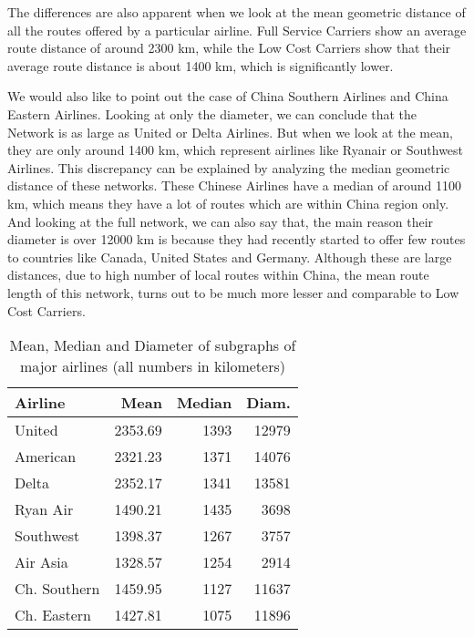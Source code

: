 \documentclass[twocolumn]{tum-article}
\begin{document}
The differences are also apparent when we look at the mean geometric distance of all the routes offered by a particular airline.
Full Service Carriers show an average route distance of around 2300 km, while the Low Cost Carriers show that their average route distance is about 1400 km, which is significantly lower.


We would also like to point out the case of China Southern Airlines and China Eastern Airlines.
Looking at only the diameter, we can conclude that the Network is as large as United or Delta Airlines.
But when we look at the mean, they are only around 1400 km, which represent airlines like Ryanair or Southwest Airlines.
This discrepancy can be explained by analyzing the median geometric distance of these networks.
These Chinese Airlines have a median of around 1100 km, which means they have a lot of routes which are within China region only. 
And looking at the full network, we can also say that, the main reason their diameter is over 12000 km is because they had recently started to offer few routes to countries like Canada, United States and Germany.
Although these are large distances, due to high number of local routes within China, the mean route length of this network, turns out to be much more lesser and comparable to Low Cost Carriers. 

\begin{table}[ht]
\begin{center}
 \begin{tabular}{| l | r | r | r |}
 \hline
 \textbf{Airline} & \textbf{Mean} & \textbf{Median} & \textbf{Diam.} \\ 
 \hline
 United & 2353.69 & 1393 & 12979 \\
 \hline   
 American & 2321.23 & 1371 & 14076 \\
 \hline   
 Delta & 2352.17 & 1341 & 13581 \\
 \hline   
 Ryan Air & 1490.21 & 1435 & 3698 \\
 \hline   
 Southwest & 1398.37 & 1267 & 3757 \\
 \hline   
 Air Asia & 1328.57 & 1254 & 2914 \\
 \hline   
 Ch. Southern & 1459.95 & 1127 & 11637 \\
 \hline   
 Ch. Eastern & 1427.81 & 1075 & 11896 \\
 \hline
 \end{tabular}
\caption{Mean, Median and Diameter of subgraphs of major airlines (all numbers in kilometers)}
\label{Tab:distance_airlines}
\end{center}
\end{table}
\end{document}
